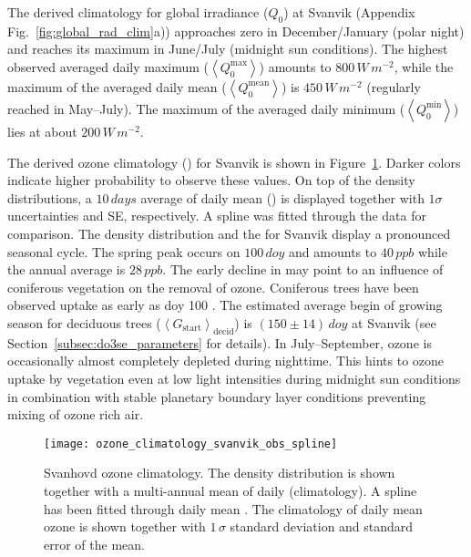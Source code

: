 \documentclass[bg, manuscript]{copernicus}
\begin{document}
The derived climatology for global irradiance ($Q_0$) at Svanvik (Appendix Fig.~\ref{fig:global_rad_clim}a)) approaches zero in December/January (polar night) and reaches its maximum in June/July (midnight sun conditions). The highest observed averaged daily maximum ($\left<Q_0^\mathrm{max}\right>$) amounts to $800\,\unit{W\,m^{-2}}$, while the maximum of the averaged daily mean ($\left<Q_0^\mathrm{mean}\right>$) is $450\,\unit{W\,m^{-2}}$ (regularly reached in May--July). The maximum of the averaged daily minimum ($\left<Q_0^\mathrm{min}\right>$) lies at about $200\,\unit{W\,m^{-2}}$.

The derived ozone climatology (\chem{\left<[O_3]\right>}) for Svanvik is shown in Figure~\ref{fig:ozone_climatology_fenoscandic_obs_spline}. Darker colors indicate higher probability to observe these values. On top of the density distributions, a $10\,\unit{days}$ average of daily mean () is displayed together with $1 \sigma$ uncertainties and SE, respectively. A spline was fitted through the data for comparison. The \chem{[O_3]} density distribution and the  for Svanvik display a pronounced seasonal cycle. The spring peak occurs on $100\,\unit{doy}$ and amounts to $40\,\unit{ppb}$ while the annual average \chem{\left<[O_3]\right>} is $28\,\unit{ppb}$. 
The early decline in \chem{\left<[O_3]\right>} may point to an influence of coniferous vegetation on the removal of ozone. Coniferous trees have been observed  uptake as early as \unit{doy} 100 \citep{TB:Kolari2007, TP:Wallin2013}. The estimated average begin of growing season for deciduous trees ($\left<G_\mathrm{start}\right>_\mathrm{decid}$) is $(150\pm 14)\,\unit{doy}$ at Svanvik (see Section~\ref{subsec:do3se_parameters} for details). In July--September, ozone is occasionally almost completely depleted during nighttime. This hints to ozone uptake by vegetation even at low light intensities during midnight sun conditions in combination with stable planetary boundary layer conditions preventing mixing of ozone rich air.

\begin{figure}[t]
  \texttt{[image: ozone\_climatology\_svanvik\_obs\_spline]}
  \caption{Svanhovd ozone climatology. The density distribution is shown together with a multi-annual mean of daily \chem{[O_3]} (climatology). A spline has been fitted through daily mean \chem{[O_3]}. The climatology of daily mean ozone is shown together with $1\,\sigma$ standard deviation and standard error of the mean.}
  \label{fig:ozone_climatology_fenoscandic_obs_spline}
\end{figure}
\end{document}
